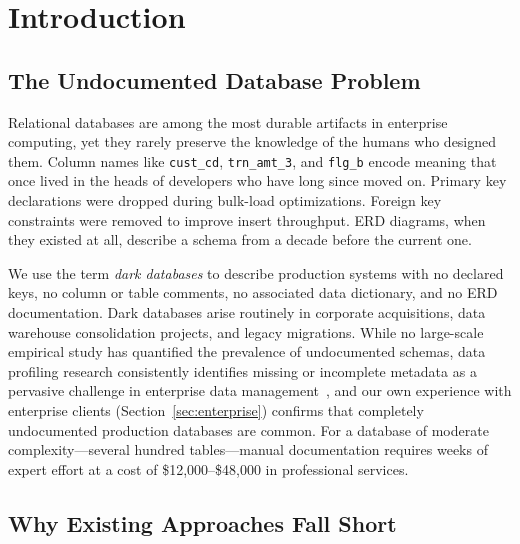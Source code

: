 \documentclass[sigconf, nonacm]{acmart}
\begin{document}
\maketitle

\section{Introduction}

\subsection{The Undocumented Database Problem}

Relational databases are among the most durable artifacts in enterprise computing, yet they rarely preserve the knowledge of the humans who designed them. Column names like \texttt{cust\_cd}, \texttt{trn\_amt\_3}, and \texttt{flg\_b} encode meaning that once lived in the heads of developers who have long since moved on. Primary key declarations were dropped during bulk-load optimizations. Foreign key constraints were removed to improve insert throughput. ERD diagrams, when they existed at all, describe a schema from a decade before the current one.

We use the term \emph{dark databases} to describe production systems with no declared keys, no column or table comments, no associated data dictionary, and no ERD documentation. Dark databases arise routinely in corporate acquisitions, data warehouse consolidation projects, and legacy migrations. While no large-scale empirical study has quantified the prevalence of undocumented schemas, data profiling research consistently identifies missing or incomplete metadata as a pervasive challenge in enterprise data management~\cite{abedjan2015profiling}, and our own experience with enterprise clients (Section~\ref{sec:enterprise}) confirms that completely undocumented production databases are common. For a database of moderate complexity---several hundred tables---manual documentation requires weeks of expert effort at a cost of \$12,000--\$48,000 in professional services.

\subsection{Why Existing Approaches Fall Short}
\end{document}
